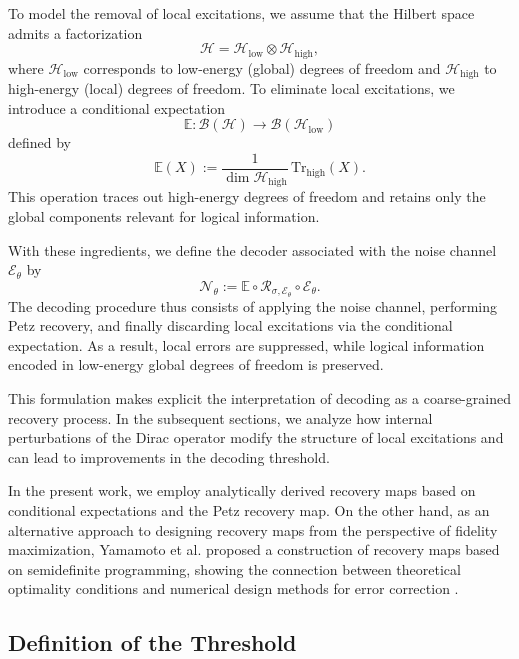 \documentclass[12pt]{article}
\theoremstyle{definition} %
\theoremstyle{plain} %
\theoremstyle{remark} %
\theoremstyle{underline}
\begin{document}
To model the removal of local excitations, we assume that the Hilbert space admits a factorization
\[
    \mathcal{H}
    =
    \mathcal{H}_{\mathrm{low}}\otimes\mathcal{H}_{\mathrm{high}},
\]
where $\mathcal{H}_{\mathrm{low}}$ corresponds to low-energy (global) degrees of freedom and $\mathcal{H}_{\mathrm{high}}$ to high-energy (local) degrees of freedom.
To eliminate local excitations, we introduce a conditional expectation\cite{TAKESAKI1972306}
\[
    \mathbb{E}:\mathcal{B}(\mathcal{H})\to \mathcal{B}(\mathcal{H}_{\mathrm{low}})
\]
defined by
\[
    \mathbb{E}(X)
    :=
    \frac{1}{\dim\mathcal{H}_{\mathrm{high}}}\,
    \mathrm{Tr}_{\mathrm{high}}(X).
\]
This operation traces out high-energy degrees of freedom and retains only the global components relevant for logical information.

With these ingredients, we define the decoder associated with the noise channel $\mathcal{E}_\theta$ by
\[
    \mathcal{N}_\theta
    :=
    \mathbb{E}\circ
    \mathcal{R}_{\sigma,\mathcal{E}_\theta}\circ
    \mathcal{E}_\theta.
\]
The decoding procedure thus consists of applying the noise channel,
performing Petz recovery, and finally discarding local excitations via the conditional expectation.
As a result, local errors are suppressed, while logical information encoded in low-energy global degrees of freedom is preserved.

This formulation makes explicit the interpretation of decoding as a coarse-grained recovery process.
In the subsequent sections, we analyze how internal perturbations of the Dirac operator modify the structure of local excitations and can lead to improvements in the decoding threshold.

In the present work, we employ analytically derived recovery maps based on conditional expectations and the Petz recovery map. On the other hand, as an alternative approach to designing recovery maps from the perspective of fidelity maximization, Yamamoto et al. proposed a construction of recovery maps based on semidefinite programming, showing the connection between theoretical optimality conditions and numerical design methods for error correction \cite{yamamoto2005suboptimal}.



\subsection{Definition of the Threshold}
\end{document}
